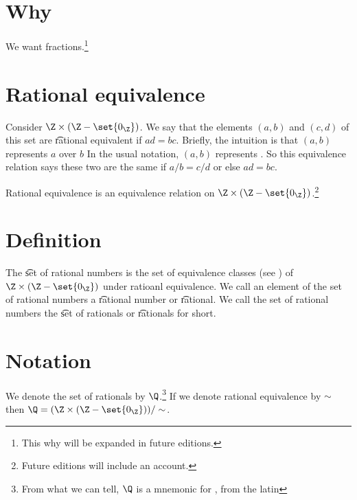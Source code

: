 

\section*{Why}

We want fractions.\footnote{This why will be expanded in future editions.}

\section*{Rational equivalence}

Consider $\Z  \times (\Z  - \set{0_{\Z }})$.
We say that the elements $(a, b)$ and $(c, d)$ of this set are \t{rational equivalent} if $ad = bc$.
Brieﬂy, the intuition is that $(a, b)$ represents $a$ over $b$
In the usual notation, $(a, b)$ represents .
So this equivalence relation says these two are the same if $a/b = c/d$ or else $ad= bc$.

\begin{proposition}
Rational equivalence is an equivalence relation on $\Z \times (\Z  - \set{0_{\Z }})$.\footnote{Future editions will include an account.}
\end{proposition}
\section*{Definition}

The \t{set of rational numbers} is the set of equivalence classes (see ) of $\Z  \times (\Z  - \set{0_{\Z }})$ under ratioanl equivalence.
We call an element of the set of rational numbers a \t{rational number} or \t{rational}.
We call the set of rational numbers the \t{set of rationals} or \t{rationals} for short.

\section*{Notation}

We denote the set of rationals by $\Q $.\footnote{From what we can tell, $\Q $ is a mnemonic for , from the latin }
If we denote rational equivalence by $\sim$ then $\Q  = (\Z \times (\Z  - \set{0_{\Z }}))/\sim$.

\blankpage